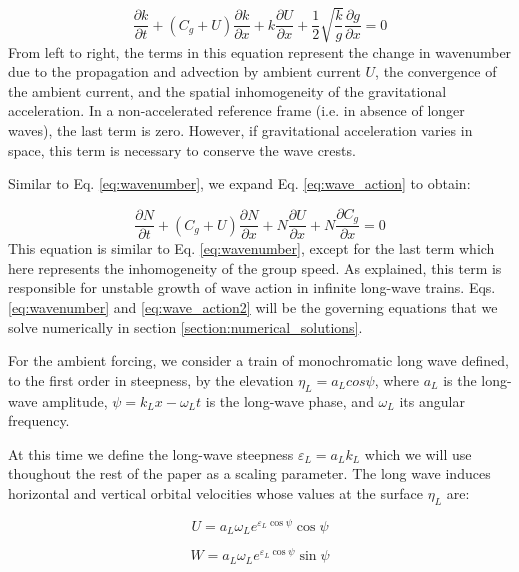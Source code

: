 \documentclass[draft]{agujournal2019}
\begin{document}
\begin{equation}
\label{eq:wavenumber}
\dfrac{\partial k}{\partial t}
+ \left(C_g + U\right) \dfrac{\partial k}{\partial x}
+ k \dfrac{\partial U}{\partial x}
+ \dfrac{1}{2} \sqrt{\dfrac{k}{g}} \dfrac{\partial g}{\partial x}
= 0
\end{equation}
From left to right, the terms in this equation represent the change in wavenumber
due to the propagation and advection by ambient current $U$, the convergence of
the ambient current, and the spatial inhomogeneity of the gravitational acceleration.
In a non-accelerated reference frame (i.e. in absence of longer waves), the last
term is zero.
However, if gravitational acceleration varies in space, this term is necessary
to conserve the wave crests.

Similar to Eq. \ref{eq:wavenumber}, we expand Eq. \ref{eq:wave_action} to obtain:

\begin{equation}
\label{eq:wave_action2}
\dfrac{\partial N}{\partial t}
+ \left(C_g + U\right) \dfrac{\partial N}{\partial x}
+ N \dfrac{\partial U}{\partial x}
+ N \dfrac{\partial C_g}{\partial x}
= 0
\end{equation}
This equation is similar to Eq. \ref{eq:wavenumber}, except for the last term
which here represents the inhomogeneity of the group speed.
As  explained, this term is responsible for unstable
growth of wave action in infinite long-wave trains.
Eqs. \ref{eq:wavenumber} and \ref{eq:wave_action2} will be the governing equations
that we solve numerically in section \ref{section:numerical_solutions}.

For the ambient forcing, we consider a train of monochromatic long wave
defined, to the first order in steepness, by the elevation $\eta_L = a_L cos{\psi}$,
where $a_L$ is the long-wave amplitude, $\psi = k_L x - \omega_L t$ is the
long-wave phase, and $\omega_L$ its angular frequency.

At this time we define the long-wave steepness $\varepsilon_L = a_L k_L$ which
we will use thoughout the rest of the paper as a scaling parameter.
The long wave induces horizontal and vertical orbital velocities whose values
at the surface $\eta_L$ are:

\begin{equation}
\label{eq:U_L}
U = a_L \omega_L e^{\varepsilon_L \cos{\psi}} \cos{\psi}
\end{equation}

\begin{equation}
\label{eq:w_L}
W = a_L \omega_L e^{\varepsilon_L \cos{\psi}} \sin{\psi}
\end{equation}
\end{document}
